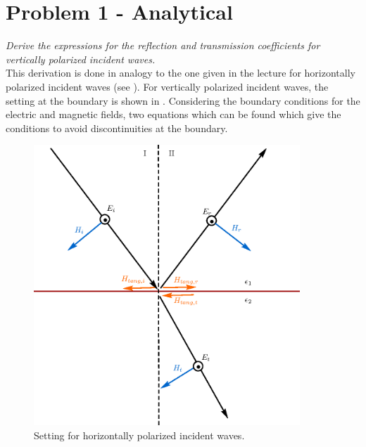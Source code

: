 \section{Problem 1 - Analytical}
\textit{Derive the expressions for the reflection and transmission coefficients for vertically polarized incident waves.}\\

This derivation is done in analogy to the one given in the lecture for horizontally polarized incident waves (see ). For vertically polarized incident waves, the setting at the boundary is shown in . Considering the boundary conditions for the electric and magnetic fields, two equations which can be found which give the conditions to avoid discontinuities at the boundary. 

 \begin{figure} [!h]
 \centering
 \includegraphics[width=10cm]{figures/mm12_1_H.eps}
 \caption{Setting for horizontally polarized incident waves.} \label{fig:mm12_1_H}
 \end{figure}

